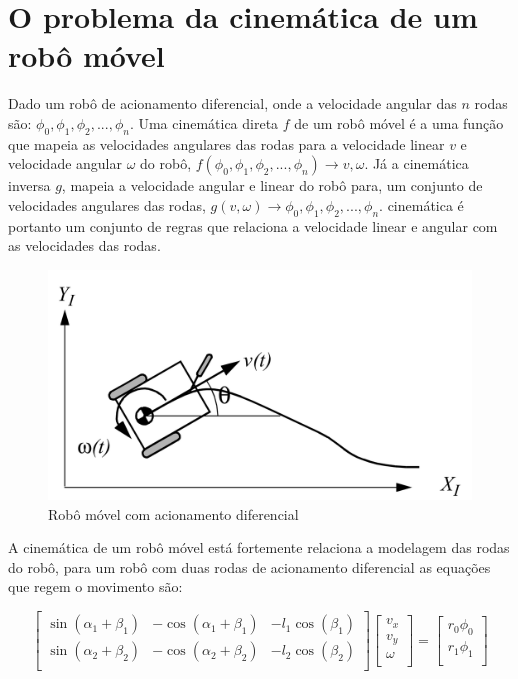 
\label{Cap:Teoria}

\section{O problema da cinemática de um robô móvel}
Dado um robô de acionamento diferencial, onde a velocidade
angular das $n$ rodas são: $\phi_0,\phi_1,\phi_2,...,\phi_n$.
Uma cinemática direta $f$ de um robô móvel é a uma função que mapeia as velocidades
angulares das rodas para a velocidade linear $v$ e velocidade angular $\omega$
do robô, $f(\phi_0,\phi_1,\phi_2,...,\phi_n) \rightarrow v,\omega$. Já
a cinemática inversa $g$, mapeia a velocidade angular e linear do robô para, um
conjunto de velocidades angulares das rodas, $g(v,\omega) \rightarrow  \phi_0,\phi_1,\phi_2,...,\phi_n$.
cinemática é portanto um conjunto de regras que relaciona a velocidade linear e angular
com as velocidades das rodas.

\begin{figure}[H]
    \centering
    \includegraphics[scale=0.9]{figuras/robo.png}
    \caption[]{Robô móvel com acionamento diferencial}
\end{figure}

A cinemática de um robô móvel está fortemente relaciona a modelagem
das rodas do robô, para um robô com duas rodas de acionamento diferencial
as equações que regem o movimento são:

\[
\begin{bmatrix}
    \sin(\alpha_{1} + \beta_{1}) &  -\cos(\alpha_{1} + \beta_{1}) &  -l_1\cos(\beta_{1})\\
    \sin(\alpha_{2} + \beta_{2}) &  -\cos(\alpha_{2} + \beta_{2}) &  -l_2\cos(\beta_{2})\\
\end{bmatrix}
\begin{bmatrix}
    v_x \\
    v_y \\
    \omega\\
\end{bmatrix}
=
\begin{bmatrix}
    r_0\phi_0 \\
    r_1\phi_1 \\
\end{bmatrix}
\]


